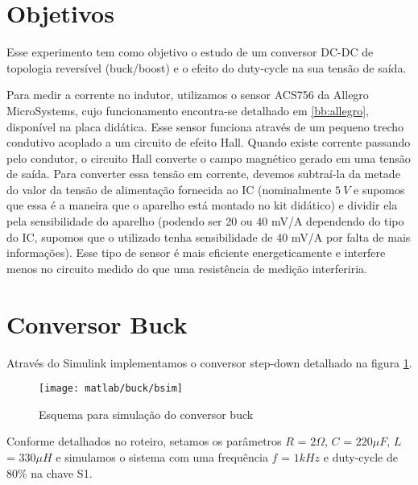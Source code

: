 \documentclass{article}
\begin{document}


\onehalfspacing
\section{Objetivos}
	Esse experimento tem como objetivo o estudo de um conversor DC-DC de topologia reversível (buck/boost) e o efeito do duty-cycle na sua tensão de saída.

	Para medir a corrente no indutor, utilizamos o sensor ACS756 da Allegro MicroSystems, cujo funcionamento encontra-se detalhado em \ref{bb:allegro}, disponível na placa didática. Esse sensor funciona através de um pequeno trecho condutivo acoplado a um circuito de efeito Hall. Quando existe corrente passando pelo condutor, o circuito Hall converte o campo magnético gerado em uma tensão de saída. Para converter essa tensão em corrente, devemos subtraí-la da metade do valor da tensão de alimentação fornecida ao IC (nominalmente $5\ V$ e supomos que essa é a maneira que o aparelho está montado no kit didático) e dividir ela pela sensibilidade do aparelho (podendo ser 20 ou 40 mV/A dependendo do tipo do IC, supomos que o utilizado tenha sensibilidade de 40 mV/A por falta de mais informações). Esse tipo de sensor é mais eficiente energeticamente e interfere menos no circuito medido do que uma resistência de medição interferiria.
\section{Conversor Buck}
Através do Simulink implementamos o conversor step-down detalhado na figura \ref{fig:bsim}.
\begin{figure}[H]
	\centering
	\texttt{[image: matlab/buck/bsim]}
	\caption{Esquema para simulação do conversor buck}
	\label{fig:bsim}
\end{figure}
Conforme detalhados no roteiro, setamos os parâmetros $R$ = $2\Omega$, $C$ = $220\mu F$, $L$ = $330\mu H$ e simulamos o sistema com uma frequência $f$ = $1kHz$ e duty-cycle de 80\% na chave S1.
\end{document}
